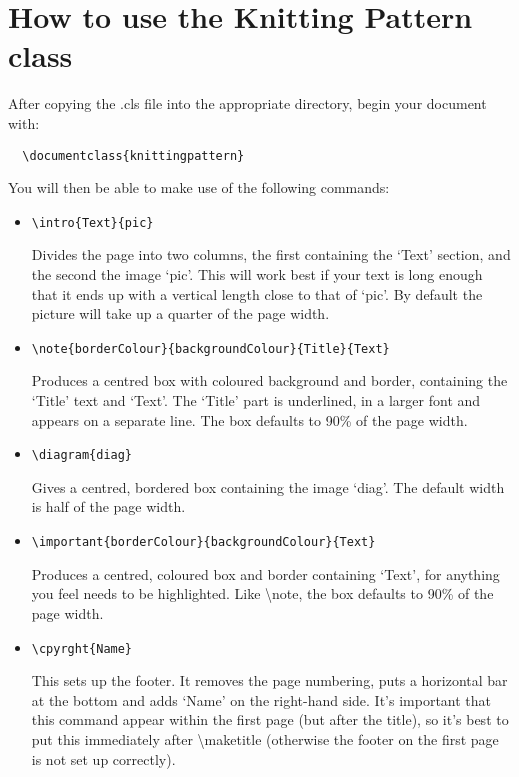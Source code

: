 \documentclass{article}
\begin{document}
\section*{How to use the Knitting Pattern class}
After copying the .cls file into the appropriate directory, begin your document with:
\begin{verbatim}
  \documentclass{knittingpattern}
\end{verbatim}
You will then be able to make use of the following commands:
\begin{itemize}
\item
\begin{verbatim}
\intro{Text}{pic}
\end{verbatim}
Divides the page into two columns, the first containing the `Text'
section, and the second the image `pic'.  This will work best if your
text is long enough that it ends up with a vertical length close to
that of `pic'.  By default the picture will take up a quarter of the
page width.

\item
\begin{verbatim}
\note{borderColour}{backgroundColour}{Title}{Text}
\end{verbatim}
Produces a centred box with coloured background and border, containing
the `Title' text and `Text'.  The `Title' part is underlined, in a
larger font and appears on a separate line.  The box defaults to 90\%
of the page width.

\item
\begin{verbatim}
\diagram{diag}
\end{verbatim}
Gives a centred, bordered box containing the image
`diag'.  The default width is half of the page width.

\item
\begin{verbatim}
\important{borderColour}{backgroundColour}{Text}
\end{verbatim}
Produces a centred, coloured box and border containing `Text', for
anything you feel needs to be highlighted.  Like \textbackslash{}note,
the box defaults to 90\% of the page width.

\item
\begin{verbatim}
\cpyrght{Name} 
\end{verbatim}
This sets up the footer.  It removes the page numbering, puts a
horizontal bar at the bottom and adds `Name' on the right-hand side.
It's important that this command appear within the first page (but
after the title), so it's best to put this immediately after
\textbackslash{}maketitle (otherwise the footer on the first page is
not set up correctly).


\end{itemize}
\end{document}
